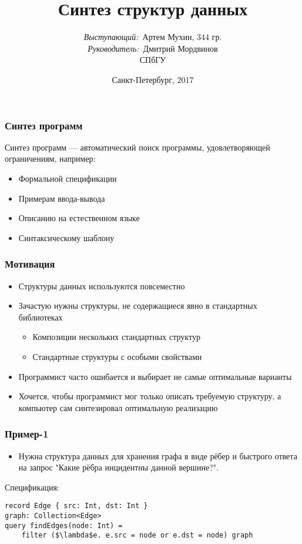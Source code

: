 \documentclass[14pt]{beamer}
\title{\small{Синтез структур данных}}
\author{\small{%
\emph{Выступающий:}~Артем Мухин, 344 гр.\\%
\emph{Руководитель:}~Дмитрий Мордвинов}\\%
\vspace{30pt}%
СПбГУ
\vspace{20pt}%
}
\date{\small{Санкт-Петербург, 2017}}
\begin{document}
\maketitle

\begin{frame}
\frametitle{Синтез программ}
Синтез программ --- автоматический поиск программы, удовлетворяющей ограничениям, например:
\begin{itemize}
    \item Формальной спецификации
    \item Примерам ввода-вывода
    \item Описанию на естественном языке
    \item Синтаксическому шаблону
\end{itemize}
\end{frame}

\begin{frame}
\frametitle{Мотивация}
\begin{itemize}
    \item Структуры данных используются повсеместно
    \item Зачастую нужны структуры, не содержащиеся явно в стандартных библиотеках
    \begin{itemize}
        \item Композиции нескольких стандартных структур
        \item Стандартные структуры с особыми свойствами
    \end{itemize}
    \item Программист часто ошибается и выбирает не самые оптимальные варианты
    \item Хочется, чтобы программист мог только описать требуемую структуру,
    а компьютер сам синтезировал оптимальную реализацию
\end{itemize}
\end{frame}


\begin{frame}[fragile]
\frametitle{Пример-1}
\begin{itemize}
  \item Нужна структура данных для хранения графа в виде рёбер и быстрого ответа на запрос "Какие рёбра инцидентны данной вершине?".
\end{itemize}
Спецификация:
\begin{lstlisting}[mathescape=true]
record Edge { src: Int, dst: Int }
graph: Collection<Edge>
query findEdges(node: Int) =
    filter ($\lambda$e. e.src = node or e.dst = node) graph
\end{lstlisting}
\end{frame}
\end{document}
